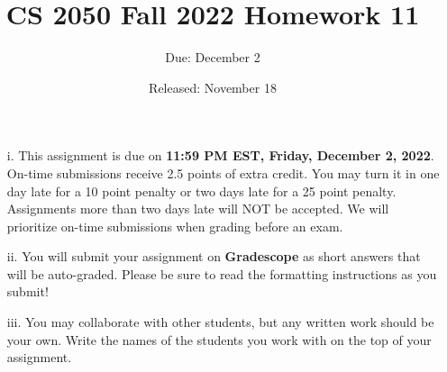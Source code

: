 \documentclass{article}
\title{CS 2050 Fall 2022 Homework 11}
\author{Due: December 2}
\date{Released: November 18}
\begin{document}
\maketitle

\begin{enumerate}
    \item[i.] This assignment is due on \textbf{11:59 PM EST, Friday, December 2, 2022}.  On-time submissions receive 2.5 points of extra credit. You may turn it in one day late for a 10 point penalty or two days late for a 25 point penalty. Assignments more than two days late will NOT be accepted.  We will prioritize on-time submissions when grading before an exam.
    \item[ii.] You will submit your assignment on \textbf{Gradescope} as short answers that will be auto-graded. Please be sure to read the formatting instructions as you submit!
    \item[iii.] You may collaborate with other students, but any written work should be your own. Write the names of the students you work with on the top of your assignment.
\end{enumerate}
\end{document}
